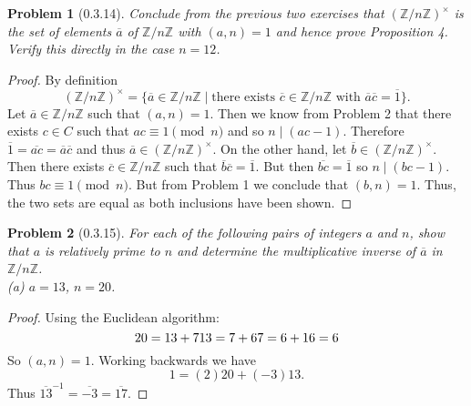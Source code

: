 \documentclass{article}
\newtheorem{problem}{Problem}
\begin{document}
\begin{problem}[0.3.14]
Conclude from the previous two exercises that $(\mathbb{Z}/n\mathbb{Z})^{\times}$ is the set of elements $\overline{a}$ of $\mathbb{Z}/n\mathbb{Z}$ with $(a,n) = 1$ and hence prove Proposition 4. Verify this directly in the case $n = 12$.
\end{problem}
\begin{proof}
By definition
\[
(\mathbb{Z}/n\mathbb{Z})^{\times} = \{\overline{a} \in \mathbb{Z}/n\mathbb{Z} \mid \text{there exists } \overline{c} \in \mathbb{Z}/n\mathbb{Z} \text{ with } \overline{a}\overline{c} = \overline{1}\}.
\]
Let $\overline{a} \in \mathbb{Z}/n\mathbb{Z}$ such that $(a,n) = 1$. Then we know from Problem 2 that there exists $c \in C$ such that $ac \equiv 1 \pmod{n}$ and so $n \mid (ac - 1)$. Therefore $\overline{1} = \overline{ac} = \overline{a}\overline{c}$ and thus $\overline{a} \in (\mathbb{Z}/n\mathbb{Z})^{\times}$. On the other hand, let $\overline{b} \in (\mathbb{Z}/n\mathbb{Z})^{\times}$. Then there exists $\overline{c} \in \mathbb{Z}/n\mathbb{Z}$ such that $\overline{b}\overline{c} = \overline{1}$. But then $\overline{bc} = \overline{1}$ so $n \mid (bc - 1)$. Thus $bc \equiv 1 \pmod{n}$. But from Problem 1 we conclude that $(b,n) = 1$. Thus, the two sets are equal as both inclusions have been shown.
\end{proof}

\begin{problem}[0.3.15]
For each of the following pairs of integers $a$ and $n$, show that $a$ is relatively prime to $n$ and determine the multiplicative inverse of $\overline{a}$ in $\mathbb{Z}/n\mathbb{Z}$.\\
(a) $a = 13$, $n = 20$.
\end{problem}
\begin{proof}
Using the Euclidean algorithm:
\[
20 = 13 + 7\\
13 = 7 + 6\\
7 = 6 + 1\\
6 = 6
\]
So $(a,n) = 1$. Working backwards we have
\[
1 = (2)20 + (-3)13.
\]
Thus $\overline{13}^{-1} = \overline{-3} = \overline{17}$.
\end{proof}
\end{document}
